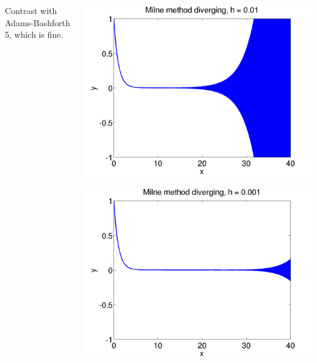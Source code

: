 \documentclass{beamer}
\begin{document}
\begin{frame}
\begin{columns}
\begin{column}{0.5\textwidth}
      Contrast with Adams-Bashforth 5, which is fine.
    \end{column}
    \begin{column}{0.5\textwidth}
      \begin{overlayarea}{\textwidth}{0.6\textheight}
        {
          \begin{center}
            \includegraphics[height=0.5\textheight]{figures/MilneStability1}
          \end{center}
        }
        {
          \begin{center}
            \includegraphics[height=0.5\textheight]{figures/MilneStability2}
          \end{center}
}
\end{overlayarea}
\end{column}
\end{columns}
\end{frame}
\end{document}
